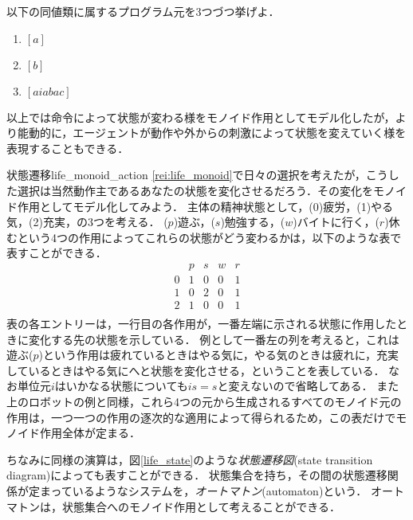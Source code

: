 \documentclass[11pt,a4paper, dvipdfmx]{jsarticle}
\begin{document}
\begin{renshu}{}{}
    以下の同値類に属するプログラム元を3つづつ挙げよ．
    \begin{enumerate}
        \item $[a]$
        \item $[b]$
        \item $[aiabac]$
    \end{enumerate}
\end{renshu}


以上では命令によって状態が変わる様をモノイド作用としてモデル化したが，より能動的に，エージェントが動作や外からの刺激によって状態を変えていく様を表現することもできる．

\begin{rei}{状態遷移}{life_monoid_action}
    \ref{rei:life_monoid}で日々の選択を考えたが，こうした選択は当然動作主であるあなたの状態を変化させるだろう．その変化をモノイド作用としてモデル化してみよう．
    主体の精神状態として，(0)疲労，(1)やる気，(2)充実，の3つを考える．
    ($p$)遊ぶ，($s$)勉強する，($w$)バイトに行く，($r$)休むという4つの作用によってこれらの状態がどう変わるかは，以下のような表で表すことができる．
    \[
        \begin{array}{c|cccc}
               & p & s & w & r \\ \hline
             0 & 1 & 0 & 0 & 1 \\
             1 & 0 & 2 & 0 & 1 \\ 
             2 & 1 & 0 & 0 & 1 \\
        \end{array}
    \]
    表の各エントリーは，一行目の各作用が，一番左端に示される状態に作用したときに変化する先の状態を示している．
    例として一番左の列を考えると，これは遊ぶ($p$)という作用は疲れているときはやる気に，やる気のときは疲れに，充実しているときはやる気にへと状態を変化させる，ということを表している．
    なお単位元$i$はいかなる状態についても$is = s$と変えないので省略してある．
    また上のロボットの例と同様，これら4つの元から生成されるすべてのモノイド元の作用は，一つ一つの作用の逐次的な適用によって得られるため，この表だけでモノイド作用全体が定まる．
\end{rei}

ちなみに同様の演算は，図\ref{life_state}のような\emph{状態遷移図}(state transition diagram)によっても表すことができる．
状態集合を持ち，その間の状態遷移関係が定まっているようなシステムを，\emph{オートマトン}(automaton)という．
オートマトンは，状態集合へのモノイド作用として考えることができる．
\end{document}
